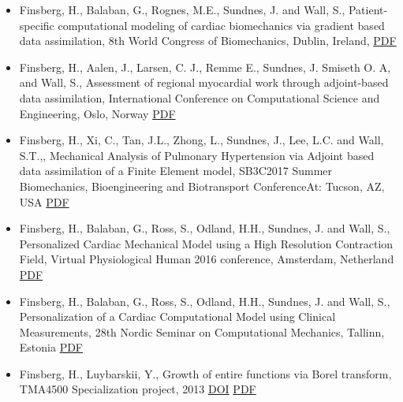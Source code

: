 \documentclass[11pt, a4paper]{article}
\begin{document}
\begin{raggedright}
\begin{itemize}
\item
  Finsberg, H., Balaban, G., Rognes, M.E., Sundnes, J. and Wall, S.,
  Patient-specific computational modeling of cardiac biomechanics via
  gradient based data assimilation, 8th World Congress of Biomechanics,
  Dublin, Ireland,
  \href{https://www.researchgate.net/publication/328733786_Patient-specific_computational_modeling_of_cardiac_biomechanics_via_gradient_based_data_assimilation}{PDF}
\item
  Finsberg, H., Aalen, J., Larsen, C. J., Remme E., Sundnes, J. Smiseth
  O. A, and Wall, S., Assessment of regional myocardial work through
  adjoint-based data assimilation, International Conference on
  Computational Science and Engineering, Oslo, Norway
  \href{https://www.researchgate.net/publication/328733792_Assessment_of_regional_myocardial_work_through_adjoint-based_data_assimilation}{PDF}
\item
  Finsberg, H., Xi, C., Tan, J.L., Zhong, L., Sundnes, J., Lee, L.C. and
  Wall, S.T.,, Mechanical Analysis of Pulmonary Hypertension via Adjoint
  based data assimilation of a Finite Element model, SB3C2017 Summer
  Biomechanics, Bioengineering and Biotransport ConferenceAt: Tucson,
  AZ, USA
  \href{https://www.researchgate.net/publication/325301179_MECHANICAL_ANALYSIS_OF_PULMONARY_HYPERTENSION_VIA_ADJOINT_BASED_DATA_ASSIMILATION_OF_A_FINITE_ELEMENT_MODEL}{PDF}
\item
  Finsberg, H., Balaban, G., Ross, S., Odland, H.H., Sundnes, J. and
  Wall, S., Personalized Cardiac Mechanical Model using a High
  Resolution Contraction Field, Virtual Physiological Human 2016
  conference, Amsterdam, Netherland
  \href{https://www.researchgate.net/publication/328733694_Personalized_Cardiac_Mechanical_Model_using_a_High_Resolution_Contraction_Field}{PDF}
\item
  Finsberg, H., Balaban, G., Ross, S., Odland, H.H., Sundnes, J. and
  Wall, S., Personalization of a Cardiac Computational Model using
  Clinical Measurements, 28th Nordic Seminar on Computational Mechanics,
  Tallinn, Estonia
  \href{https://www.researchgate.net/publication/325301428_Personalization_of_a_Cardiac_Computational_Model_using_Clinical_Measurements}{PDF}
\item
  Finsberg, H., Luybarskii, Y., Growth of entire functions via Borel
  transform, TMA4500 Specialization project, 2013
  \href{http://doi.org/10.13140/RG.2.2.10460.44160}{DOI}
  \href{https://www.researchgate.net/profile/Henrik_Finsberg/publication/327633791_Growth_of_entire_functions_via_Borel_transform/links/5b9ab94145851574f7c5a499/Growth-of-entire-functions-via-Borel-transform.pdf}{PDF}
\end{itemize}


\end{raggedright}
\end{document}
